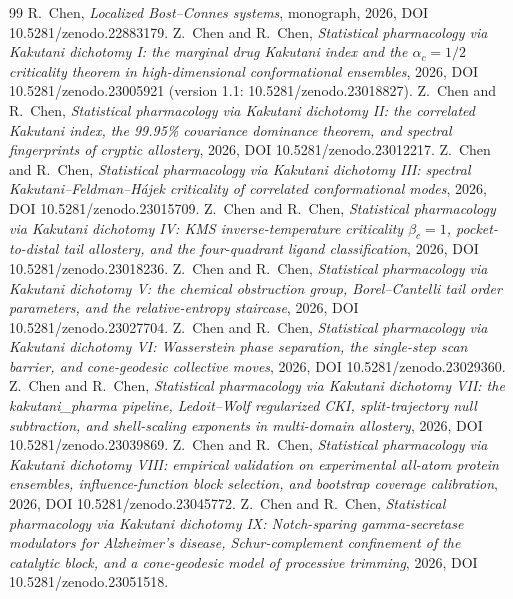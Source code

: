 \documentclass[11pt,reqno]{amsart}
\theoremstyle{plain}
\theoremstyle{definition}
\theoremstyle{remark}
\numberwithin{equation}{section}
\begin{document}
\begin{thebibliography}{99}
 R.~Chen, \emph{Localized Bost--Connes systems}, monograph, 2026, DOI 10.5281/zenodo.22883179.
 Z.~Chen and R.~Chen, \emph{Statistical pharmacology via Kakutani dichotomy I: the marginal drug Kakutani index and the $\alpha_c=1/2$ criticality theorem in high-dimensional conformational ensembles}, 2026, DOI 10.5281/zenodo.23005921 (version 1.1: 10.5281/zenodo.23018827).
 Z.~Chen and R.~Chen, \emph{Statistical pharmacology via Kakutani dichotomy II: the correlated Kakutani index, the 99.95\% covariance dominance theorem, and spectral fingerprints of cryptic allostery}, 2026, DOI 10.5281/zenodo.23012217.
 Z.~Chen and R.~Chen, \emph{Statistical pharmacology via Kakutani dichotomy III: spectral Kakutani--Feldman--H\'ajek criticality of correlated conformational modes}, 2026, DOI 10.5281/zenodo.23015709.
 Z.~Chen and R.~Chen, \emph{Statistical pharmacology via Kakutani dichotomy IV: KMS inverse-temperature criticality $\beta_c=1$, pocket-to-distal tail allostery, and the four-quadrant ligand classification}, 2026, DOI 10.5281/zenodo.23018236.
 Z.~Chen and R.~Chen, \emph{Statistical pharmacology via Kakutani dichotomy V: the chemical obstruction group, Borel--Cantelli tail order parameters, and the relative-entropy staircase}, 2026, DOI 10.5281/zenodo.23027704.
 Z.~Chen and R.~Chen, \emph{Statistical pharmacology via Kakutani dichotomy VI: Wasserstein phase separation, the single-step scan barrier, and cone-geodesic collective moves}, 2026, DOI 10.5281/zenodo.23029360.
 Z.~Chen and R.~Chen, \emph{Statistical pharmacology via Kakutani dichotomy VII: the kakutani\_pharma pipeline, Ledoit--Wolf regularized CKI, split-trajectory null subtraction, and shell-scaling exponents in multi-domain allostery}, 2026, DOI 10.5281/zenodo.23039869.
 Z.~Chen and R.~Chen, \emph{Statistical pharmacology via Kakutani dichotomy VIII: empirical validation on experimental all-atom protein ensembles, influence-function block selection, and bootstrap coverage calibration}, 2026, DOI 10.5281/zenodo.23045772.
 Z.~Chen and R.~Chen, \emph{Statistical pharmacology via Kakutani dichotomy IX: Notch-sparing gamma-secretase modulators for Alzheimer's disease, Schur-complement confinement of the catalytic block, and a cone-geodesic model of processive trimming}, 2026, DOI 10.5281/zenodo.23051518.

\end{thebibliography}
\end{document}
